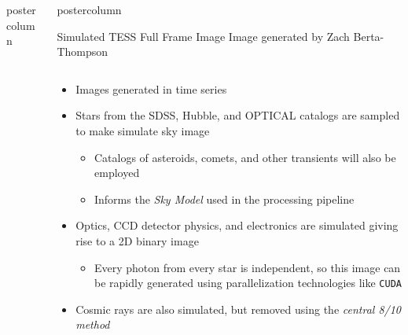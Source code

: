 \documentclass[final,hyperref={pdfpagelabels=false}]{beamer}
\newlength{\columnheight}
\begin{document}
\begin{frame}
\begin{columns}
\begin{column}{.49\textwidth}
\begin{beamercolorbox}[center,wd=\textwidth]{postercolumn}
\begin{minipage}[T]{.95\textwidth}
{          }
        \end{minipage}
      \end{beamercolorbox}
    \end{column}

    \begin{column}{.49\textwidth}
      \begin{beamercolorbox}[center,wd=\textwidth]{postercolumn}
        \begin{minipage}[T]{.95\textwidth}
          \parbox[t][\columnheight]{\textwidth}{
            \begin{block}{Simulated TESS Full Frame Image}
            Image generated by Zach Berta-Thompson
              \begin{columns}
                \begin{column}{.60\textwidth}
                \begin{itemize}
                    \item Images generated in time series
                    \item Stars from the SDSS, Hubble, and OPTICAL catalogs are sampled to make simulate sky image
                    \begin{itemize}
                    	\item Catalogs of asteroids, comets, and other transients will also be employed
			\item Informs the \emph{Sky Model} used in the processing pipeline
                    \end{itemize}
                    \vfill
                    \item Optics, CCD detector physics, and electronics are simulated giving rise to a 2D binary image
                    \begin{itemize}
                    	\item Every photon from every star is independent, so this image can be rapidly generated using parallelization technologies like \texttt{CUDA} 
                    \end{itemize}
                    \vfill
                    \item Cosmic rays are also simulated, but removed using the \emph{central 8/10 method}
                    \vfill
                \end{itemize}
                \end{column}

\end{columns}
\end{block}}
\end{minipage}
\end{beamercolorbox}
\end{column}
\end{columns}
\end{frame}
\end{document}
